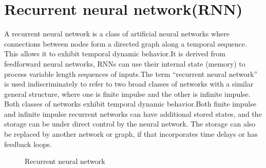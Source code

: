 \section{Recurrent neural network(RNN)}
A recurrent neural network is a class of artificial neural networks where connections between nodes form a directed graph along a temporal sequence. This allows it to exhibit temporal dynamic behavior.It is derived from feedforward neural networks, RNNs can use their internal state (memory) to process variable length sequences of inputs.The term “recurrent neural network” is used indiscriminately to refer to two broad classes of networks with a similar general structure, where one is finite impulse and the other is infinite impulse. Both classes of networks exhibit temporal dynamic behavior.Both finite impulse and infinite impulse recurrent networks can have additional stored states, and the storage can be under direct control by the neural network. The storage can also be replaced by another network or graph, if that incorporates time delays or has feedback loops.\cite{rnn}
\begin{figure}
%
  \caption{Recurrent neural network}
  \label{fig:key}
\end{figure}

